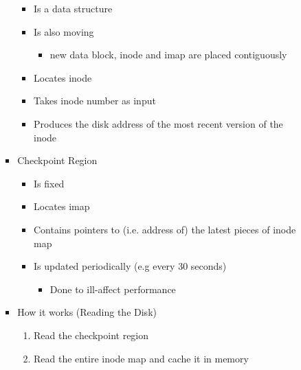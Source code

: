 \documentclass[12pt]{article}
\begin{document}
\begin{enumerate}[1.]
\begin{enumerate}[1)]
\begin{itemize}
\begin{itemize}
                \begin{itemize}
                    \item Is a data structure
                    \item Is also moving
                    \begin{itemize}
                        \item new data block, inode and imap are placed contiguously
                    \end{itemize}
                    \item Locates inode
                    \item Takes inode number as input
                    \item Produces the disk address of the most recent version of the inode
                \end{itemize}

                \item Checkpoint Region

                \begin{itemize}
                    \item Is fixed
                    \item Locates imap
                    \item Contains pointers to (i.e. address of) the latest pieces of inode map
                    \item Is updated periodically (e.g every 30 seconds)
                    \begin{itemize}
                        \item Done to ill-affect performance
                    \end{itemize}
                \end{itemize}

                \item How it works (Reading the Disk)

                \begin{enumerate}[1.]
                    \item Read the checkpoint region
                    \item Read the entire inode map and cache it in memory
                \end{enumerate}
            \end{itemize}
        \end{itemize}


    \end{enumerate}

\end{enumerate}
\end{document}
